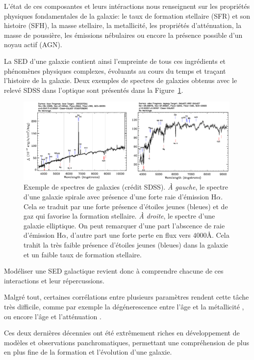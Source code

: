 \documentclass[../main/main.tex]{subfiles}
\begin{document}
L'état de ces composantes et
leurs intéractions nous renseignent sur les propriétés physiques fondamentales
de la galaxie: le taux de formation stellaire (SFR) et son histoire
(SFH), la masse stellaire, la metallicité, les propriétés d'atténuation, la masse de
poussière, les émissions nébulaires ou encore la présence possible d'un noyau actif (AGN). 

La SED d'une galaxie contient ainsi l'empreinte de tous ces ingrédients
et phénomènes physiques complexes, évoluants au cours du temps et traçant
l'histoire de la galaxie. Deux exemples de spectres de galaxies obtenus
avec le relevé SDSS dans l'optique sont
présentés dans la Figure~\ref{fig:specgalsdss}.

\begin{figure}
  \centering
  \includegraphics[width=0.99\textwidth]{../figures/04_hypergal/specgalsdss.png}
  \caption[Exemple de spectres de galaxies]{Exemple de spectres de
    galaxies (crédit SDSS). \textit{À gauche}, le spectre d'une galaxie
    spirale avec présence d'une forte raie d'émission
    $\text{H}\alpha$. Cela se traduit par une forte présence d'étoiles
  jeunes (bleues) et de gaz qui favorise la formation stellaire. \textit{À droite},
le spectre d'une galaxie elliptique. On peut remarquer d'une part
l'abscence de raie d'émission $\text{H}\alpha$, d'autre part une
forte perte en flux vers $4000$\AA. Cela trahit la très faible présence
d'étoiles jeunes (bleues) dans la galaxie et un faible taux de formation
stellaire.}
  \label{fig:specgalsdss}
\end{figure}

Modéliser une SED galactique revient donc à comprendre chacune de ces
interactions et leur répercussions.

Malgré tout, certaines corrélations entre plusieurs paramètres rendent cette tâche
très difficile, comme par exemple la dégénerescence entre l'âge et la
métallicité \citep{Worthey}, ou encore l'âge et l'atténuation
\citep{Papovich}.

Ces deux dernières décennies ont été extrêmement riches en développement de modèles
et observations panchromatiques, permettant une compréhension de plus en
plus fine de la formation et l'évolution d'une galaxie.
\end{document}
